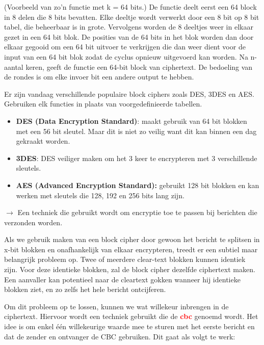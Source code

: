 \noindent (Voorbeeld van zo’n functie met k = 64 bits.) De functie deelt eerst een 64 block in 8 delen die 8 bits bevatten. Elke deeltje wordt verwerkt door een 8 bit op 8 bit tabel, die beheerbaar is in grote. Vervolgens worden de 8 deeltjes weer in elkaar gezet in een 64 bit blok. De posities van de 64 bits in het blok worden dan door elkaar gegooid om een 64 bit uitvoer te verkrijgen die dan weer dient voor de input van een 64 bit blok zodat de cyclus opnieuw uitgevoerd kan worden. Na n-aantal keren, geeft de functie een 64-bit block van ciphertext. De bedoeling van de rondes is om elke invoer bit een andere output te hebben.

\noindent Er zijn vandaag verschillende populaire block ciphers zoals DES, 3DES en AES. Gebruiken elk functies in plaats van voorgedefinieerde tabellen.
\begin{itemize}
\item \textbf{DES (Data Encryption Standard)}: maakt gebruik van 64 bit blokken met een 56 bit sleutel. Maar dit is niet zo veilig want dit kan binnen een dag gekraakt worden.
\item \textbf{3DES}: DES veiliger maken om het 3 keer te encrypteren met 3 verschillende sleutels.
\item \textbf{AES (Advanced Encryption Standard): }gebruikt 128 bit blokken en kan werken met sleutels die 128, 192 en 256 bits lang zijn.

\end{itemize}

\newpage


$\rightarrow$ Een techniek die gebruikt wordt om encryptie toe te passen bij berichten die verzonden worden.

\noindent Als we gebruik maken van een block cipher door gewoon het bericht te splitsen in x-bit blokken en onafhankelijk van elkaar encrypteren, treedt er een subtiel maar belangrijk probleem op. Twee of meerdere clear-text blokken kunnen identiek zijn. Voor deze identieke blokken, zal de block cipher dezelfde ciphertext maken. Een aanvaller kan potentieel naar de cleartext gokken wanneer hij identieke blokken ziet, en zo zelfs het hele bericht ontcijferen.

\noindent Om dit probleem op te lossen, kunnen we wat willekeur inbrengen in de ciphertext. Hiervoor wordt een techniek gebruikt die de \textcolor{red}{\textbf{\acrfull{cbc}}} genoemd wordt. Het idee is om enkel één willekeurige waarde mee te sturen met het eerste bericht en dat de zender en ontvanger de CBC gebruiken. Dit gaat als volgt te werk:

